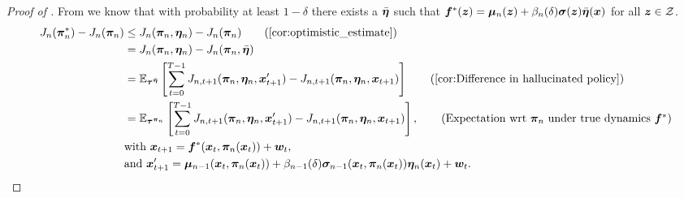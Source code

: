 \begin{proof}[Proof of ]
From  we know that with probability at least $1-\delta$ there exists a $\Bar{{\bm{\eta}}}$ such that ${\bm{f}}^*({\bm{z}}) = {\bm{\mu}}_n({\bm{z}}) + \beta_n(\delta) {\bm{\sigma}}({\bm{z}})\Bar{{\bm{\eta}}}({\bm{x}})$ for all ${\bm{z}} \in {\mathcal{Z}}$.
\begin{align*}
     J_n(\vpi_n^*) - J_n(\vpi_n) &\leq J_n(\vpi_n, \veta_n) - J_n(\vpi_n) \tag{\Cref{cor:optimistic_estimate}}\\
     &= J_n(\vpi_n, \veta_n) - J_n(\vpi_n, \Bar{\veta})\\
     &= \E_{\vtau^{\Bar{\veta}}} \left[\sum^{T-1}_{t=0} J_{n, t+1}(\vpi_n, \veta_n, \vx'_{t+1}) -  J_{n, t+1}(\vpi_n, \veta_n, \vx_{t+1})\right] \tag{\Cref{cor:Difference in hallucinated policy}}\\
    &= \E_{\vtau^{\vpi_n}}\left[\sum^{T-1}_{t=0} J_{n, t+1}(\vpi_n, \veta_n, \vx'_{t+1}) -  J_{n, t+1}(\vpi_n, \veta_n, \vx_{t+1})\right], \tag{Expectation wrt $\vpi_n$ under true dynamics $\vf^*$}\\
    &\text{with } \vx_{t+1} = \vf^*(\vx_{t}, \vpi_n(\vx_t)) + \vw_t, \\
    &\text{and } \vx'_{t+1} = \vmu_{n-1}(\vx_t, \vpi_n(\vx_t)) + \beta_{n-1}(\delta)\vsigma_{n-1}(\vx_t, \vpi_n(\vx_t)) \veta_n(\vx_t) + \vw_t.
\end{align*}
    
\end{proof}

